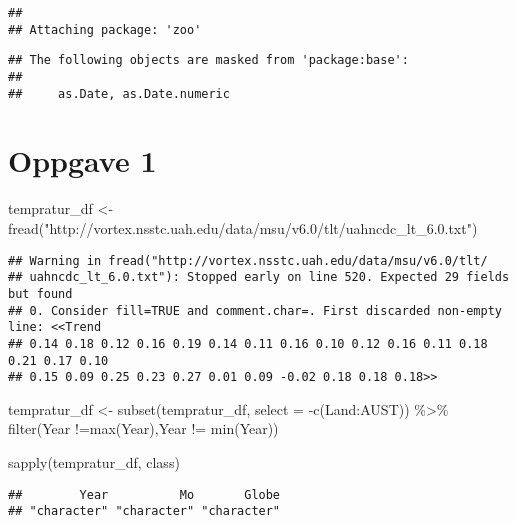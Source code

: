 \documentclass[
]{article}
\newenvironment{Shaded}{\begin{snugshade}}{\end{snugshade}}
\newcommand{\AttributeTok}[1]{\textcolor[rgb]{0.77,0.63,0.00}{#1}}
\newcommand{\FunctionTok}[1]{\textcolor[rgb]{0.00,0.00,0.00}{#1}}
\newcommand{\NormalTok}[1]{#1}
\newcommand{\OtherTok}[1]{\textcolor[rgb]{0.56,0.35,0.01}{#1}}
\newcommand{\SpecialCharTok}[1]{\textcolor[rgb]{0.00,0.00,0.00}{#1}}
\newcommand{\StringTok}[1]{\textcolor[rgb]{0.31,0.60,0.02}{#1}}
\begin{document}
\begin{verbatim}
## 
## Attaching package: 'zoo'
\end{verbatim}

\begin{verbatim}
## The following objects are masked from 'package:base':
## 
##     as.Date, as.Date.numeric
\end{verbatim}

\hypertarget{oppgave-1}{%
\section{Oppgave 1}\label{oppgave-1}}

\begin{Shaded}
\begin{Highlighting}[]
\NormalTok{tempratur\_df }\OtherTok{\textless{}{-}} \FunctionTok{fread}\NormalTok{(}\StringTok{"http://vortex.nsstc.uah.edu/data/msu/v6.0/tlt/uahncdc\_lt\_6.0.txt"}\NormalTok{)}
\end{Highlighting}
\end{Shaded}

\begin{verbatim}
## Warning in fread("http://vortex.nsstc.uah.edu/data/msu/v6.0/tlt/
## uahncdc_lt_6.0.txt"): Stopped early on line 520. Expected 29 fields but found
## 0. Consider fill=TRUE and comment.char=. First discarded non-empty line: <<Trend
## 0.14 0.18 0.12 0.16 0.19 0.14 0.11 0.16 0.10 0.12 0.16 0.11 0.18 0.21 0.17 0.10
## 0.15 0.09 0.25 0.23 0.27 0.01 0.09 -0.02 0.18 0.18 0.18>>
\end{verbatim}

\begin{Shaded}
\begin{Highlighting}[]
\NormalTok{tempratur\_df }\OtherTok{\textless{}{-}} \FunctionTok{subset}\NormalTok{(tempratur\_df, }\AttributeTok{select =} \SpecialCharTok{{-}}\FunctionTok{c}\NormalTok{(Land}\SpecialCharTok{:}\NormalTok{AUST)) }\SpecialCharTok{\%\textgreater{}\%} 
  \FunctionTok{filter}\NormalTok{(Year }\SpecialCharTok{!=}\FunctionTok{max}\NormalTok{(Year),Year }\SpecialCharTok{!=} \FunctionTok{min}\NormalTok{(Year))}

\FunctionTok{sapply}\NormalTok{(tempratur\_df, class)}
\end{Highlighting}
\end{Shaded}

\begin{verbatim}
##        Year          Mo       Globe 
## "character" "character" "character"
\end{verbatim}
\end{document}
